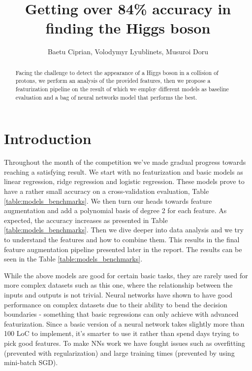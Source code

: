\documentclass[10pt,conference,compsocconf]{IEEEtran}
\begin{document}
\title{Getting over 84\% accuracy in finding the Higgs boson}

\author{
	Baetu Ciprian, Volodymyr Lyublinets, Musuroi Doru
}

\maketitle

\begin{abstract}
Facing the challenge to detect the appearance of a Higgs boson in a collision of protons, we perform an analysis of the provided features, then we propose a featurization pipeline on the result of which we employ different models as baseline evaluation and a bag of neural networks model that performs the best.
\end{abstract}

\section{Introduction}
Throughout the month of the competition we've made gradual progress towards reaching a satisfying result. 
We start with no featurization and basic models as linear regression, ridge regression and logistic regression. These models prove to have a rather small accuracy on a cross-validation evaluation, Table \ref{table:models_benchmarks}. 
We then turn our heads towards feature augmentation and add a polynomial basis of degree 2 for each feature. As expected, the accuracy increases as presented in Table \ref{table:models_benchmarks}. 
Then we dive deeper into data analysis and we try to understand the features and how to combine them. This results in the final feature augmentation pipeline presented later in the report. The results can be seen in the Table \ref{table:models_benchmarks}. 

While the above models are good for certain basic tasks, they are rarely used for more complex datasets such as this one, where the relationship between the inputs and outputs is not trivial. Neural networks have shown to have good performance on complex datasets due to their ability to bend the decision boundaries - something that basic regressions can only achieve with advanced featurization. Since a basic version of a neural network takes slightly more than 100 LoC to implement, it's smarter to use it rather than spend days trying to pick good features. To make NNs work we have fought issues such as overfitting (prevented with regularization) and large training times (prevented by using mini-batch SGD).
\end{document}
